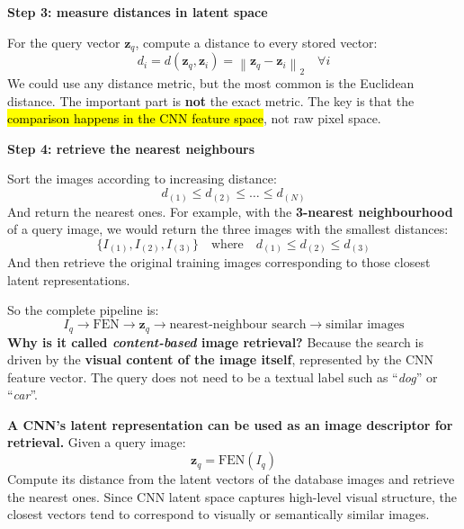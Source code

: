 \highspace
\begin{flushleft}
    \textcolor{Green3}{ \textbf{Step 3: measure distances in latent space}}
\end{flushleft}
For the query vector $\mathbf{z}_{q}$, compute a distance to every stored vector:
\begin{equation*}
    d_i = d\left(\mathbf{z}_{q}, \mathbf{z}_{i}\right) = \left\|\mathbf{z}_{q} - \mathbf{z}_{i}\right\|_{2} \quad \forall i
\end{equation*}
We could use any distance metric, but the most common is the Euclidean distance.
The important part is \textbf{not} the exact metric. The key is that the \hl{comparison happens in the CNN feature space}, not raw pixel space.

\highspace
\begin{flushleft}
    \textcolor{Green3}{ \textbf{Step 4: retrieve the nearest neighbours}}
\end{flushleft}
Sort the images according to increasing distance:
\begin{equation*}
    d_{(1)} \leq d_{(2)} \leq \ldots \leq d_{(N)}
\end{equation*}
And return the nearest ones. For example, with the \textbf{3-nearest neighbourhood} of a query image, we would return the three images with the smallest distances:
\begin{equation*}
    \{I_{(1)}, I_{(2)}, I_{(3)}\} \quad \text{where} \quad d_{(1)} \leq d_{(2)} \leq d_{(3)}
\end{equation*}
And then retrieve the original training images corresponding to those closest latent representations.

\highspace
So the complete pipeline is:
\begin{equation*}
    I_q \to \mathrm{FEN} \to \mathbf{z}_{q} \to \text{nearest-neighbour search} \to \text{similar images}
\end{equation*}
\textcolor{Green3}{ \textbf{Why is it called \emph{content-based} image retrieval?}} Because the search is driven by the \textbf{visual content of the image itself}, represented by the CNN feature vector. The query does not need to be a textual label such as ``\emph{dog}'' or ``\emph{car}''.

\highspace
\begin{takeawaysbox}
    \textbf{A CNN's latent representation can be used as an image descriptor for retrieval.} Given a query image:
    \begin{equation*}
        \mathbf{z}_{q} = \text{FEN}\left(I_q\right)
    \end{equation*}
    Compute its distance from the latent vectors of the database images and retrieve the nearest ones. Since CNN latent space captures high-level visual structure, the closest vectors tend to correspond to visually or semantically similar images.
\end{takeawaysbox}

